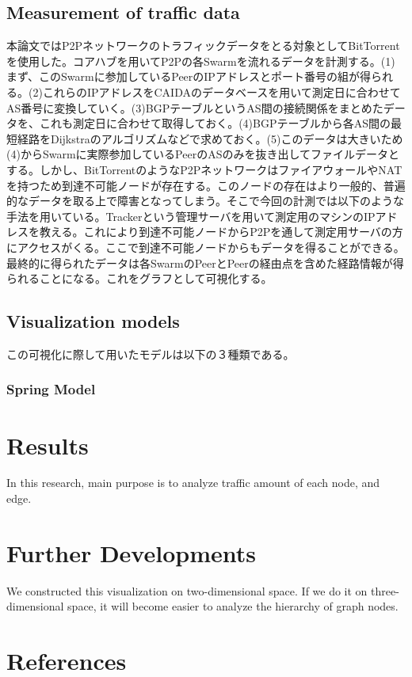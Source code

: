 \documentclass{jsarticle}
\begin{document}
\subsection{Measurement of traffic data}
本論文ではP2Pネットワークのトラフィックデータをとる対象としてBitTorrentを使用した。コアハブを用いてP2Pの各Swarmを流れるデータを計測する。(1)まず、このSwarmに参加しているPeerのIPアドレスとポート番号の組が得られる。(2)これらのIPアドレスをCAIDAのデータベースを用いて測定日に合わせてAS番号に変換していく。(3)BGPテーブルというAS間の接続関係をまとめたデータを、これも測定日に合わせて取得しておく。(4)BGPテーブルから各AS間の最短経路をDijkstraのアルゴリズムなどで求めておく。(5)このデータは大きいため(4)からSwarmに実際参加しているPeerのASのみを抜き出してファイルデータとする。しかし、BitTorrentのようなP2PネットワークはファイアウォールやNATを持つため到達不可能ノードが存在する。このノードの存在はより一般的、普遍的なデータを取る上で障害となってしまう。そこで今回の計測では以下のような手法を用いている。\cite{BitTorrent}Trackerという管理サーバを用いて測定用のマシンのIPアドレスを教える。これにより到達不可能ノードからP2Pを通して測定用サーバの方にアクセスがくる。ここで到達不可能ノードからもデータを得ることができる。最終的に得られたデータは各SwarmのPeerとPeerの経由点を含めた経路情報が得られることになる。これをグラフとして可視化する。
\subsection{Visualization models}
この可視化に際して用いたモデルは以下の３種類である。
\subsubsection{Spring Model}

\section{Results}
In this research, main purpose is to analyze traffic amount of each node, and edge.
\section{Further Developments}
We constructed this visualization on two-dimensional space. If we do it on three-dimensional space, it will become easier to analyze the hierarchy of graph nodes.
\section{References}
\twocolumn
\end{document}
